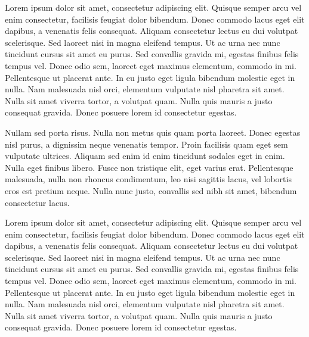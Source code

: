 Lorem ipsum dolor sit amet, consectetur adipiscing elit. Quisque semper arcu vel enim consectetur, facilisis feugiat dolor bibendum. Donec commodo lacus eget elit dapibus, a venenatis felis consequat. Aliquam consectetur lectus eu dui volutpat scelerisque. Sed laoreet nisi in magna eleifend tempus. Ut ac urna nec nunc tincidunt cursus sit amet eu purus. Sed convallis gravida mi, egestas finibus felis tempus vel. Donec odio sem, laoreet eget maximus elementum, commodo in mi. Pellentesque ut placerat ante. In eu justo eget ligula bibendum molestie eget in nulla. Nam malesuada nisl orci, elementum vulputate nisl pharetra sit amet. Nulla sit amet viverra tortor, a volutpat quam. Nulla quis mauris a justo consequat gravida. Donec posuere lorem id consectetur egestas.

Nullam sed porta risus. Nulla non metus quis quam porta laoreet. Donec egestas nisl purus, a dignissim neque venenatis tempor. Proin facilisis quam eget sem vulputate ultrices. Aliquam sed enim id enim tincidunt sodales eget in enim. Nulla eget finibus libero. Fusce non tristique elit, eget varius erat. Pellentesque malesuada, nulla non rhoncus condimentum, leo nisi sagittis lacus, vel lobortis eros est pretium neque. Nulla nunc justo, convallis sed nibh sit amet, bibendum consectetur lacus.

Lorem ipsum dolor sit amet, consectetur adipiscing elit. Quisque semper arcu vel enim consectetur, facilisis feugiat dolor bibendum. Donec commodo lacus eget elit dapibus, a venenatis felis consequat. Aliquam consectetur lectus eu dui volutpat scelerisque. Sed laoreet nisi in magna eleifend tempus. Ut ac urna nec nunc tincidunt cursus sit amet eu purus. Sed convallis gravida mi, egestas finibus felis tempus vel. Donec odio sem, laoreet eget maximus elementum, commodo in mi. Pellentesque ut placerat ante. In eu justo eget ligula bibendum molestie eget in nulla. Nam malesuada nisl orci, elementum vulputate nisl pharetra sit amet. Nulla sit amet viverra tortor, a volutpat quam. Nulla quis mauris a justo consequat gravida. Donec posuere lorem id consectetur egestas.

